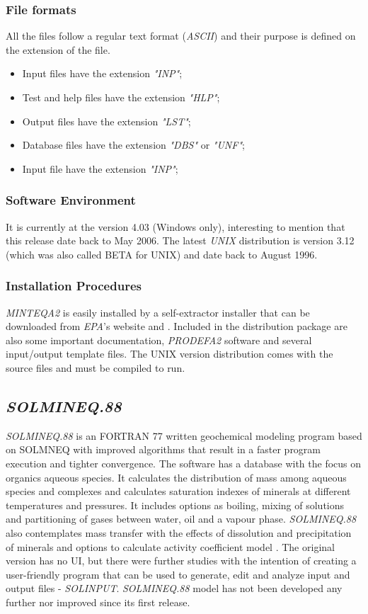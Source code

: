 \documentclass[ppgc,mestrado,english]{iiufrgs}
\begin{document}
\subsubsection{File formats}
All the files follow a regular text format (\emph{ASCII}) and their purpose is defined on the extension of the file. 
\begin{itemize}
\item Input files have the extension \emph{"INP"};
\item Test and help files have the extension \emph{"HLP"};
\item Output files have the extension \emph{"LST"};
\item Database files have the extension \emph{"DBS"} or \emph{"UNF"};
\item Input file have the extension \emph{"INP"};
\end{itemize}

\subsubsection{Software Environment}
It is currently at the version 4.03 (Windows only), interesting to mention that this release date back to May 2006. The latest \emph{UNIX} distribution is version 3.12 (which was also called BETA for UNIX) and date back to August 1996.


\subsubsection{Installation Procedures}
\emph{MINTEQA2} is easily installed by a self-extractor installer that can be downloaded from \emph{EPA}'s website \cite{minteq:website} and \cite{minteq:unix}. Included in the distribution package are also some important documentation, \emph{PRODEFA2} software and several input/output template files.
The UNIX version distribution comes with the source files and must be compiled to run.



\subsection{\emph{SOLMINEQ.88}}
\emph{SOLMINEQ.88} is an FORTRAN 77 written geochemical modeling program based on SOLMNEQ \cite{Kharaka:73} with improved algorithms that result in a faster program execution and tighter convergence. The software has a database with the focus on organics aqueous species. It calculates the distribution of mass among aqueous species and complexes and calculates saturation indexes of minerals at different temperatures and pressures. It includes options as boiling, mixing of solutions and partitioning of gases between water, oil and a vapour phase. \emph{SOLMINEQ.88} also contemplates mass transfer with the effects of dissolution and precipitation of minerals and options to calculate activity coefficient model \cite{Kharaka:88}. The original version has no UI, but there were further studies with the intention of creating a user-friendly program that can be used to generate, edit and analyze input and output files - \emph{SOLINPUT}.
\emph{SOLMINEQ.88} model has not been developed any further nor improved since its first release.
\end{document}
